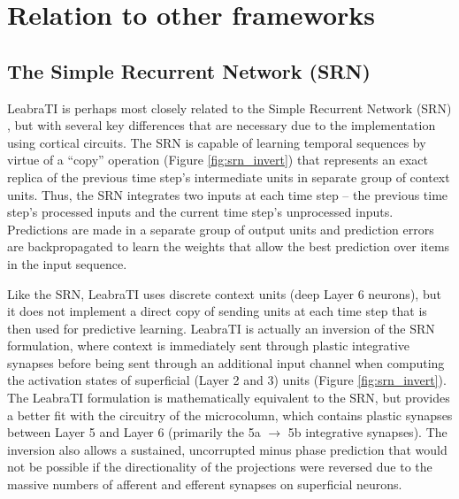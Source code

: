 \documentclass[dwyatte_dissertation.tex]{subfiles}
\begin{document}
\section{Relation to other frameworks}

\subsection{The Simple Recurrent Network (SRN)}
LeabraTI is perhaps most closely related to the Simple Recurrent Network (SRN) \cite{Elman90,Servan-SchreiberCleeremansMcClelland91}, but with several key differences that are necessary due to the implementation using cortical circuits. The SRN is capable of learning temporal sequences by virtue of a ``copy'' operation (Figure \ref{fig:srn_invert}) that represents an exact replica of the previous time step's intermediate units in separate group of context units. Thus, the SRN integrates two inputs at each time step -- the previous time step's processed inputs and the current time step's unprocessed inputs. Predictions are made in a separate group of output units and prediction errors are backpropagated to learn the weights that allow the best prediction over items in the input sequence. 

Like the SRN, LeabraTI uses discrete context units (deep Layer 6 neurons), but it does not implement a direct copy of sending units at each time step that is then used for predictive learning. LeabraTI is actually an inversion of the SRN formulation, where context is immediately sent through plastic integrative synapses before being sent through an additional input channel when computing the activation states of superficial (Layer 2 and 3) units (Figure \ref{fig:srn_invert}). The LeabraTI formulation is mathematically equivalent to the SRN, but provides a better fit with the circuitry of the microcolumn, which contains plastic synapses between Layer 5 and Layer 6 (primarily the 5a $\rightarrow$ 5b integrative synapses). The inversion also allows a sustained, uncorrupted minus phase prediction that would not be possible if the directionality of the projections were reversed due to the massive numbers of afferent and efferent synapses on superficial neurons. 
\end{document}

